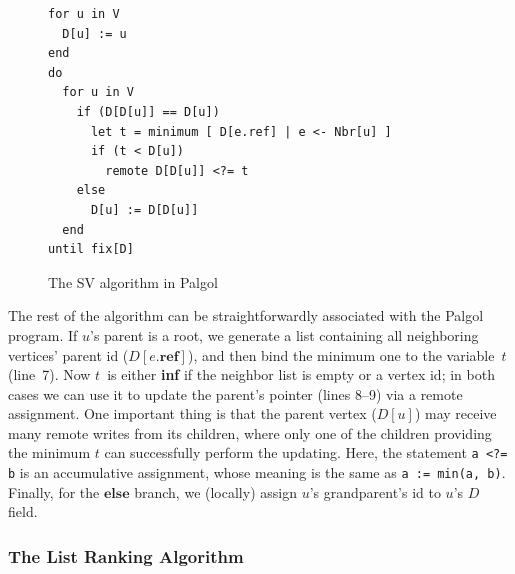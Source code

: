 \documentclass{sokendai_thesis} %
\begin{document}
\begin{figure}[t]
\begin{lstlisting}[basicstyle=\small\ttfamily]
for u in V
  D[u] := u
end
do
  for u in V
    if (D[D[u]] == D[u])
      let t = minimum [ D[e.ref] | e <- Nbr[u] ]
      if (t < D[u])
        remote D[D[u]] <?= t
    else
      D[u] := D[D[u]]
  end
until fix[D]
\end{lstlisting}
\vspace{-2ex}
\caption{The SV algorithm in Palgol}
\label{fig:svppa-code}
\end{figure}

The rest of the algorithm can be straightforwardly associated with the Palgol program.
If $u$'s parent is a root, we generate a list containing all neighboring vertices' parent id ($D[e.\mathbf{ref}]$), and then bind the minimum one to the variable~$t$ (line~7).
Now $t$~is either \textbf{inf} if the neighbor list is empty or a vertex id; in both cases we can use it to update the parent's pointer (lines 8--9) via a remote assignment.
One important thing is that the parent vertex ($D[u]$) may receive many remote writes from its children, where only one of the children providing the minimum $t$ can successfully perform the updating.
Here, the statement \texttt{a <?= b} is an accumulative assignment, whose meaning is the same as \texttt{a := min(a, b)}.
Finally, for the $\mathbf{else}$ branch, we (locally) assign $u$'s grandparent's id to $u$'s $D$ field.


\subsubsection{The List Ranking Algorithm}
\label{sec:list-ranking}
\end{document}
